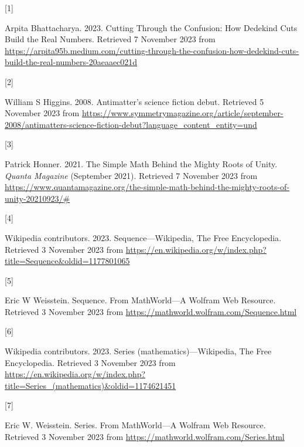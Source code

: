 \documentclass[
  a4paper,
]{article}
\newlength{\cslhangindent}
\newlength{\csllabelwidth}
\newlength{\cslentryspacingunit} %
\newenvironment{CSLReferences}[2] %
 {%
  \setlength{\parindent}{0pt}
  \ifodd #1
  \let\oldpar\par
  \def\par{\hangindent=\cslhangindent\oldpar}
  \fi
  \setlength{\parskip}{#2\cslentryspacingunit}
 }%
 {}
\newcommand{\CSLLeftMargin}[1]{\parbox[t]{\csllabelwidth}{#1}}
\newcommand{\CSLRightInline}[1]{\parbox[t]{\linewidth - \csllabelwidth}{#1}\break}
\begin{document}
\hypertarget{refs}{}
\begin{CSLReferences}{0}{0}
\leavevmode{}%
\CSLLeftMargin{{[}1{]} }%
\CSLRightInline{Arpita Bhattacharya. 2023. {Cutting Through the
Confusion: How Dedekind Cuts Build the Real Numbers}. Retrieved 7
November 2023 from
\url{https://arpita95b.medium.com/cutting-through-the-confusion-how-dedekind-cuts-build-the-real-numbers-20aeaaec021d}}

\leavevmode{}%
\CSLLeftMargin{{[}2{]} }%
\CSLRightInline{William S Higgins. 2008. {Antimatter's science fiction
debut}. Retrieved 5 November 2023 from
\url{https://www.symmetrymagazine.org/article/september-2008/antimatters-science-fiction-debut?language_content_entity=und}}

\leavevmode{}%
\CSLLeftMargin{{[}3{]} }%
\CSLRightInline{Patrick Honner. 2021. {The Simple Math Behind the Mighty
Roots of Unity}. \emph{Quanta Magazine} (September 2021). Retrieved 7
November 2023 from
\url{https://www.quantamagazine.org/the-simple-math-behind-the-mighty-roots-of-unity-20210923/\#}}

\leavevmode{}%
\CSLLeftMargin{{[}4{]} }%
\CSLRightInline{Wikipedia contributors. 2023. {Sequence---{Wikipedia}{,}
The Free Encyclopedia}. Retrieved 3 November 2023 from
\url{https://en.wikipedia.org/w/index.php?title=Sequence\&oldid=1177801065}}

\leavevmode{}%
\CSLLeftMargin{{[}5{]} }%
\CSLRightInline{Eric W Weisstein. {Sequence. From MathWorld---A Wolfram
Web Resource}. Retrieved 3 November 2023 from
\url{https://mathworld.wolfram.com/Sequence.html}}

\leavevmode{}%
\CSLLeftMargin{{[}6{]} }%
\CSLRightInline{Wikipedia contributors. 2023. {Series
(mathematics)---{Wikipedia}{,} The Free Encyclopedia}. Retrieved 3
November 2023 from
\url{https://en.wikipedia.org/w/index.php?title=Series_(mathematics)\&oldid=1174621451}}

\leavevmode{}%
\CSLLeftMargin{{[}7{]} }%
\CSLRightInline{Eric W. Weisstein. {Series. From MathWorld---A Wolfram
Web Resource}. Retrieved 3 November 2023 from
\url{https://mathworld.wolfram.com/Series.html}}

\end{CSLReferences}
\end{document}
